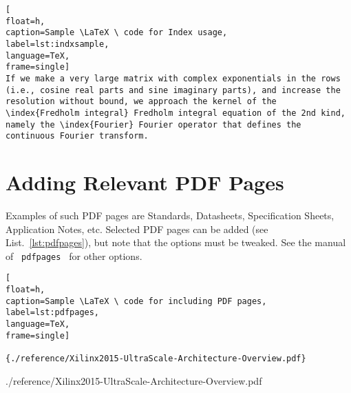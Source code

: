\begin{lstlisting}[
float=h,
caption=Sample \LaTeX \ code for Index usage, 
label=lst:indxsample,
language=TeX,
frame=single]
If we make a very large matrix with complex exponentials in the rows (i.e., cosine real parts and sine imaginary parts), and increase the resolution without bound, we approach the kernel of the \index{Fredholm integral} Fredholm integral equation of the 2nd kind, namely the \index{Fourier} Fourier operator that defines the continuous Fourier transform.
\end{lstlisting}
\cleardoublepage




\newpage
\section{Adding Relevant PDF Pages}

Examples of such PDF pages are Standards, Datasheets, Specification Sheets, Application Notes, etc.  Selected PDF pages can be added (see List.~\ref{lst:pdfpages}), but note that the options must be tweaked.  See the manual of \verb| pdfpages | for other options. 

\begin{lstlisting}[
float=h,
caption=Sample \LaTeX \ code for including PDF pages, 
label=lst:pdfpages,
language=TeX,
frame=single]

{./reference/Xilinx2015-UltraScale-Architecture-Overview.pdf}
\end{lstlisting}
\cleardoublepage


{./reference/Xilinx2015-UltraScale-Architecture-Overview.pdf}